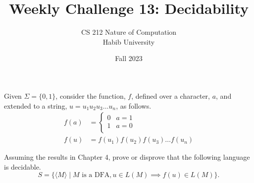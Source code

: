 \documentclass[a4paper]{exam}
\title{Weekly Challenge 13: Decidability}
\author{CS 212 Nature of Computation\\Habib University}
\date{Fall 2023}
\theoremstyle{theorem}
\theoremstyle{claim}
\begin{document}
\maketitle

\begin{questions}


  Given $\Sigma=\{0,1\}$, consider the function, $f$, defined over a character, $a$, and extended to a string, $u=u_1u_2u_3\ldots u_n$, as follows.
  \begin{align*}
    f(a) & =
           \begin{cases}
             0 & a = 1\\
             1 & a = 0\\
           \end{cases}\\
    f(u) & = f(u_1)f(u_2)f(u_3)\ldots f(u_n)
  \end{align*}

  Assuming the results in Chapter 4, prove or disprove that the following language is decidable.
\[
  S = \{\langle M\rangle \mid M\text{ is a DFA},  u\in L(M) \implies f(u)\in L(M)\}.
\]
\end{questions}
\end{document}
